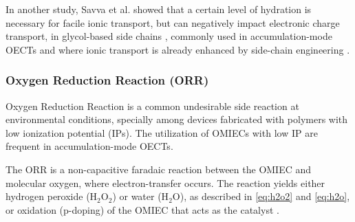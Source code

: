 
In another study, Savva et al. showed that a certain level of hydration is necessary for facile ionic transport, but can negatively impact electronic charge transport, in glycol-based side chains \cite{savvaBalancingIonicElectronic2020}, commonly used in accumulation-mode OECTs and where ionic transport is already enhanced by side-chain engineering \cite{moiaDesignEvaluationConjugated2019}. %


\subsubsection{Oxygen Reduction Reaction (ORR)}

Oxygen Reduction Reaction is a common undesirable side reaction at environmental conditions, specially among devices fabricated with polymers with low ionization potential (IPs). The utilization of OMIECs with low IP are frequent in accumulation-mode OECTs. 



The ORR is a non-capacitive faradaic reaction between the OMIEC and molecular oxygen, where electron-transfer occurs. The reaction yields either hydrogen peroxide (H$_{2}$O$_{2}$) or water (H$_{2}$O), as described in \ref{eq:h2o2} and \ref{eq:h2o}, or oxidation (p-doping) of the OMIEC that acts as the catalyst \cite{giovannittiEnergeticControlRedoxActive2020}. 

